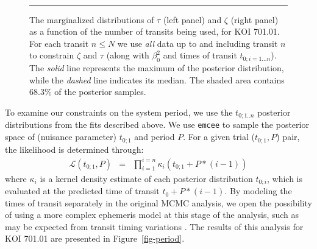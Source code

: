 \begin{figure}[t] 
\begin{center} 
\mbox{
\quad
{}
}
\caption{The marginalized distributions of $\tau$ (left panel) and
  $\zeta$ (right panel) as a function of the number of transits being
  used, for KOI 701.01.  For each transit $n \leq N$ we use {\it all}
  data up to and including transit $n$ to constrain $\zeta$ and $\tau$
  (along with $\beta_0^2$ and times of transit $t_{0;i=1...n}$).  The
  {\it solid} line represents the maximum of the posterior
  distribution, while the {\it dashed} line indicates its median.  The
  shaded area contains 68.3\% of the posterior samples.}
\hspace*{\fill}  
\hrule
\label{fig-marg} 
\end{center} 
\end{figure}

To examine our constraints on the system period, we use the
$t_{0;1..n}$ posterior distributions from the fits described above.
We use {\tt emcee} to sample the posterior space of (nuisance
parameter) $t_{0;1}$ and period $P$.  For a given trial ($t_{0;1}, P$)
pair, the likelihood is determined through:
\begin{eqnarray}
\mathcal{L}(t_{0;1}, P) & = & \prod_{i=1}^{i=n} \kappa_i(t_{0;1} + P * (i-1))
\end{eqnarray}
where $\kappa_i$ is a kernel density estimate of each posterior
distribution $t_{0;i}$, which is evaluated at the predicted time of
transit $t_0 + P * (i-1)$.  By modeling the times of transit
separately in the original MCMC analysis, we open the possibility of
using a more complex ephemeris model at this stage of the analysis,
such as may be expected from transit timing variations
\citep{2005MNRAS.359..567A,2005Sci...307.1288H}.  The results of this
analysis for KOI 701.01 are presented in Figure~\ref{fig-period}.

